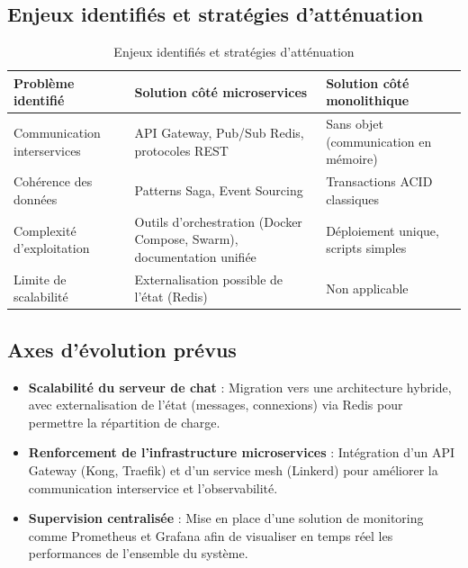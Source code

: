 \documentclass[12pt]{rapportPfe}
\begin{document}
\subsection{Enjeux identifiés et stratégies d’atténuation}

\begin{table}[H]
\centering
\begin{tabular}{|p{4.5cm}|p{5cm}|p{5cm}|}
\hline
\textbf{Problème identifié} & \textbf{Solution côté microservices} & \textbf{Solution côté monolithique} \\
\hline
Communication interservices & API Gateway, Pub/Sub Redis, protocoles REST & Sans objet (communication en mémoire) \\
\hline
Cohérence des données & Patterns Saga, Event Sourcing & Transactions ACID classiques \\
\hline
Complexité d’exploitation & Outils d’orchestration (Docker Compose, Swarm), documentation unifiée & Déploiement unique, scripts simples \\
\hline
Limite de scalabilité & Externalisation possible de l’état (Redis) & Non applicable \\
\hline
\end{tabular}
\caption{Enjeux identifiés et stratégies d’atténuation}
\label{tab:prob_solut}
\end{table}

\subsection{Axes d’évolution prévus}

\begin{itemize}
    \item \textbf{Scalabilité du serveur de chat} : Migration vers une architecture hybride, avec externalisation de l’état (messages, connexions) via Redis pour permettre la répartition de charge.
    
    \item \textbf{Renforcement de l'infrastructure microservices} : Intégration d’un API Gateway (Kong, Traefik) et d’un service mesh (Linkerd) pour améliorer la communication interservice et l'observabilité.
    
    \item \textbf{Supervision centralisée} : Mise en place d’une solution de monitoring comme Prometheus et Grafana afin de visualiser en temps réel les performances de l’ensemble du système.
\end{itemize}
\end{document}
